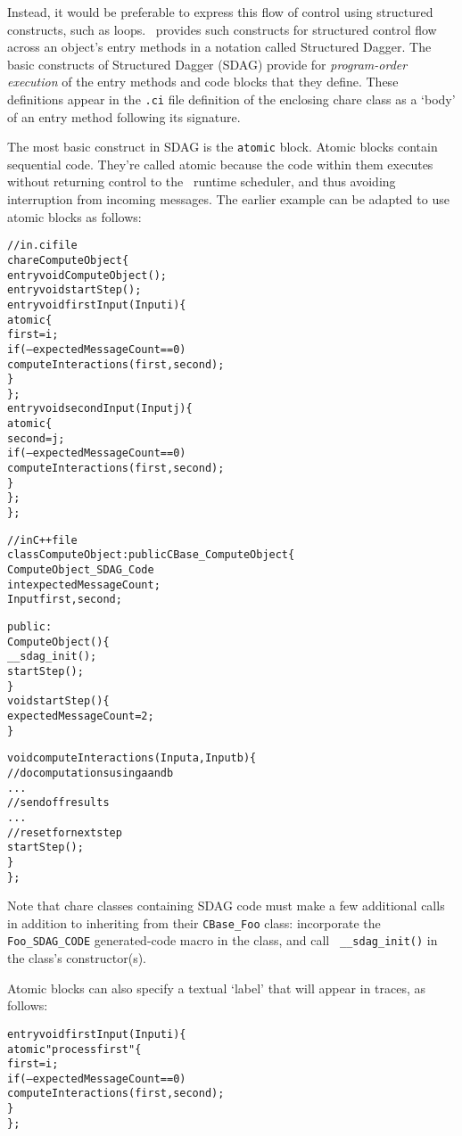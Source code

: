 Instead, it would be preferable to express this flow of control using
structured constructs, such as loops. \charmpp\ provides such constructs for
structured control flow across an object's entry methods in a notation called
Structured Dagger. The basic constructs of Structured Dagger (SDAG) provide for
\emph{program-order execution} of the entry methods and code blocks that they
define. These definitions appear in the {\tt .ci} file definition of the
enclosing chare class as a `body' of an entry method following its signature.

The most basic construct in SDAG is the {\tt atomic} block. Atomic blocks
contain sequential \CC code.  They're called atomic because the code within
them executes without returning control to the \charmpp\ runtime scheduler, and
thus avoiding interruption from incoming messages. The earlier example can be
adapted to use atomic blocks as follows:
\begin{center}
\begin{alltt}
// in .ci file
chare ComputeObject \{
  entry void ComputeObject();
  entry void startStep();
  entry void firstInput(Input i) \{
    atomic \{
      first = i;
      if (--expectedMessageCount == 0)
        computeInteractions(first, second);
    \}
  \};
  entry void secondInput(Input j) \{
    atomic \{
      second = j;
      if (--expectedMessageCount == 0)
        computeInteractions(first, second);
    \}
  \};
\};

// in C++ file
class ComputeObject : public CBase\_ComputeObject \{
  ComputeObject\_SDAG\_Code
  int   expectedMessageCount;
  Input first, second;

public:
  ComputeObject() \{
    __sdag_init();
    startStep();
  \}
  void startStep() \{
    expectedMessageCount = 2;
  \}

  void computeInteractions(Input a, Input b) \{
    // do computations using a and b
    . . .
    // send off results
    . . .
    // reset for next step
    startStep();
  \}
\};
\end{alltt}
\end{center}
Note that chare classes containing SDAG code must make a few additional calls
in addition to inheriting from their {\tt CBase\_Foo} class: incorporate the
{\tt Foo\_SDAG\_CODE} generated-code macro in the class, and call {\tt
  \_\_sdag\_init()} in the class's constructor(s).

Atomic blocks can also specify a textual `label' that will appear in traces, as
follows:
\begin{center}
\begin{alltt}
  entry void firstInput(Input i) \{
    atomic "process first" \{
      first = i;
      if (--expectedMessageCount == 0)
        computeInteractions(first, second);
    \}
  \};
\end{alltt}
\end{center}

